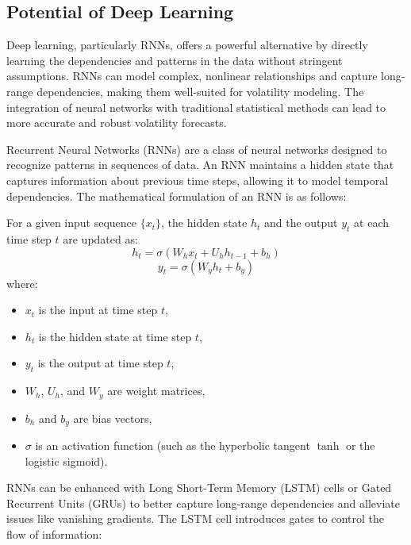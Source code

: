 \documentclass[letterpaper, 11pt]{article}
\begin{document}
\subsection{Potential of Deep Learning}
Deep learning, particularly RNNs, offers a powerful alternative by directly learning the dependencies and patterns in the data without stringent assumptions. RNNs can model complex, nonlinear relationships and capture long-range dependencies, making them well-suited for volatility modeling. The integration of neural networks with traditional statistical methods can lead to more accurate and robust volatility forecasts.

Recurrent Neural Networks (RNNs) are a class of neural networks designed to recognize patterns in sequences of data. An RNN maintains a hidden state that captures information about previous time steps, allowing it to model temporal dependencies. The mathematical formulation of an RNN is as follows:

For a given input sequence \( \{x_t\} \), the hidden state \( h_t \) and the output \( y_t \) at each time step \( t \) are updated as:
\begin{equation}
h_t = \sigma(W_h x_t + U_h h_{t-1} + b_h)
\end{equation}
\begin{equation}
y_t = \sigma(W_y h_t + b_y)
\end{equation}
where:
\begin{itemize}
    \item \( x_t \) is the input at time step \( t \),
    \item \( h_t \) is the hidden state at time step \( t \),
    \item \( y_t \) is the output at time step \( t \),
    \item \( W_h \), \( U_h \), and \( W_y \) are weight matrices,
    \item \( b_h \) and \( b_y \) are bias vectors,
    \item \( \sigma \) is an activation function (such as the hyperbolic tangent \( \tanh \) or the logistic sigmoid).
\end{itemize}

RNNs can be enhanced with Long Short-Term Memory (LSTM) cells or Gated Recurrent Units (GRUs) to better capture long-range dependencies and alleviate issues like vanishing gradients. The LSTM cell introduces gates to control the flow of information:
\end{document}
